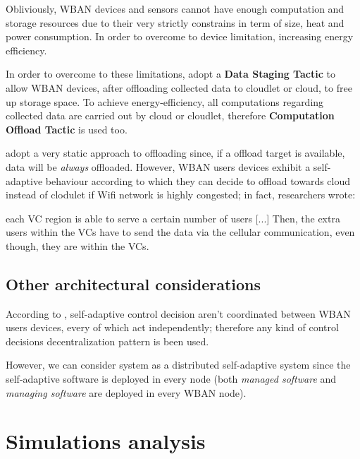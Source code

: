 \documentclass[sigchi]{acmart}
\begin{document}
\vspace{0.3cm}

Obliviously, WBAN devices and sensors cannot have enough computation and storage resources due to their very strictly constrains in term of size, heat and power consumption. In order to overcome to device limitation, increasing energy efficiency.

In order to overcome to these limitations, \citet{MSAReport} adopt a \textbf{Data Staging Tactic} to allow WBAN devices, after oﬄoading
collected data to cloudlet or cloud, to free up storage space. To achieve energy-efficiency, all computations regarding collected data 
are carried out by cloud or cloudlet, therefore \textbf{Computation Offload Tactic} is used too.

\cite{MSAReport} adopt a very static approach to offloading since, if a offload target is available, data will be \textit{always} offloaded. 
However, WBAN users devices exhibit a self-adaptive behaviour according to which they can decide to offload towards cloud instead of clodulet if Wifi network is highly congested; in fact, researchers wrote:

\vspace{0.3cm}

\begin{quoting}[font=itshape, begintext={``}, endtext={''\cite[par.~5.1]{MSAReport}}]
each VC region is able to serve a certain number of users [...] Then, the extra users within the VCs have to send the data via the cellular communication, even though, they are within the VCs. 
\end{quoting}

\vspace{0.3cm}

\subsection{Other architectural considerations}

According to \citep{MSAReport}, self-adaptive control decision aren't coordinated between WBAN users devices, every of which act independently; therefore any kind of control decisions decentralization pattern is been used.

However, we can consider \citet{MSAReport} system as a distributed self-adaptive system since the self-adaptive software is deployed in every node (both \textit{managed software} and \textit{managing software} are deployed in every WBAN node).

\section{Simulations analysis}
\end{document}
